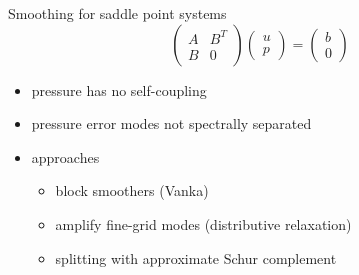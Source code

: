 \begin{frame}{Smoothing for saddle point systems}
  \begin{equation*}
  \begin{pmatrix}
    A & B^T \\ B & 0
  \end{pmatrix}
  \begin{pmatrix}
    u \\ p
  \end{pmatrix}
  =
  \begin{pmatrix}
    b \\ 0
  \end{pmatrix}
\end{equation*}
  \begin{itemize}
  \item pressure has no self-coupling
  \item pressure error modes not spectrally separated
  \item approaches
    \begin{itemize}
    \item block smoothers (Vanka)
    \item amplify fine-grid modes (distributive relaxation)
    \item splitting with approximate Schur complement
    \end{itemize}
  \end{itemize}
\end{frame}
